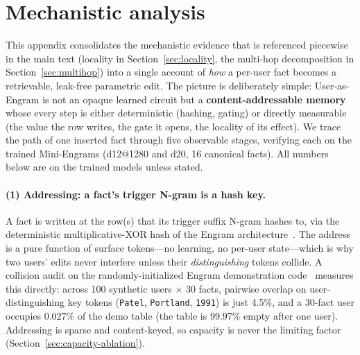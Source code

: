 \documentclass[11pt]{article}
\begin{document}
\section{Mechanistic analysis}
\label{app:mech}

This appendix consolidates the mechanistic evidence that is
referenced piecewise in the main text (locality in
Section~\ref{sec:locality}, the multi-hop decomposition in
Section~\ref{sec:multihop}) into a single account of \emph{how} a
per-user fact becomes a retrievable, leak-free parametric edit.
The picture is deliberately simple: User-as-Engram is not an
opaque learned circuit but a \textbf{content-addressable memory}
whose every step is either deterministic (hashing, gating) or
directly measurable (the value the row writes, the gate it opens,
the locality of its effect). We trace the path of one inserted fact
through five observable stages, verifying each on the trained
Mini-Engrams (d12@1280 and d20, 16 canonical facts). All numbers
below are on the trained models unless stated.

\paragraph{(1) Addressing: a fact's trigger N-gram is a hash key.}
A fact is written at the row(s) that its trigger suffix N-gram
hashes to, via the deterministic multiplicative-XOR hash of the
Engram architecture~\citep{cheng2026engram}. The address is a
pure function of surface tokens---no learning, no per-user
state---which is why two users' edits never interfere unless
their \emph{distinguishing} tokens collide. A collision audit on
the randomly-initialized Engram demonstration
code~\citep{cheng2026engram} measures this directly: across
100 synthetic users $\times$ 30 facts, pairwise overlap on
user-distinguishing key tokens (\texttt{Patel}, \texttt{Portland},
\texttt{1991}) is just 4.5\%, and a 30-fact user occupies
0.027\% of the demo table (the table is 99.97\% empty after one
user). Addressing is sparse and content-keyed,
so capacity is never the limiting factor
(Section~\ref{sec:capacity-ablation}).
\end{document}
